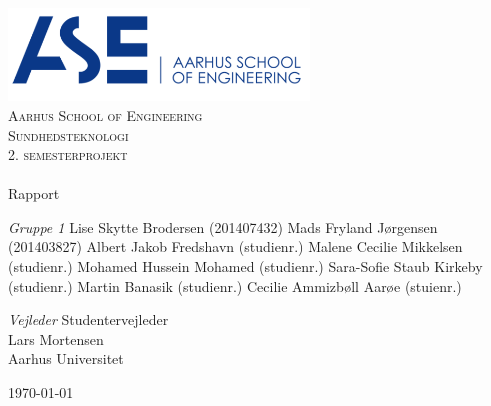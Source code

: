 \begin{titlingpage}
\begin{center}

~ \\[3cm]

\includegraphics[width=0.6\textwidth]{figurer/ASE}~\\[1cm]

\textsc{\LARGE Aarhus School of Engineering}\\[1.5cm]

\textsc{\Large Sundhedsteknologi}\\
\textsc{\Large 2. semesterprojekt}\\[0.5cm]

\noindent\makebox[\linewidth]{\rule{\textwidth}{0.4pt}}\\
[0.5cm]{\Huge Rapport}
\noindent\makebox[\linewidth]{\rule{\textwidth}{0.4pt}}

\end{center}

\textit{Gruppe 1} \newline
Lise Skytte Brodersen (201407432) \newline
Mads Fryland J\o rgensen (201403827) \newline
Albert Jakob Fredshavn (studienr.) \newline
Malene Cecilie Mikkelsen (studienr.) \newline		 
Mohamed Hussein Mohamed (studienr.) \newline 
Sara-Sofie Staub Kirkeby (studienr.) \newline
Martin Banasik (studienr.) \newline
Cecilie Ammizb\o ll Aar\o e (stuienr.) \newline 


\textit{Vejleder} \newline
Studentervejleder\\
Lars Mortensen\\
Aarhus Universitet


\vfill

\begin{center}
{\large \today}
\end{center}


\end{titlingpage}